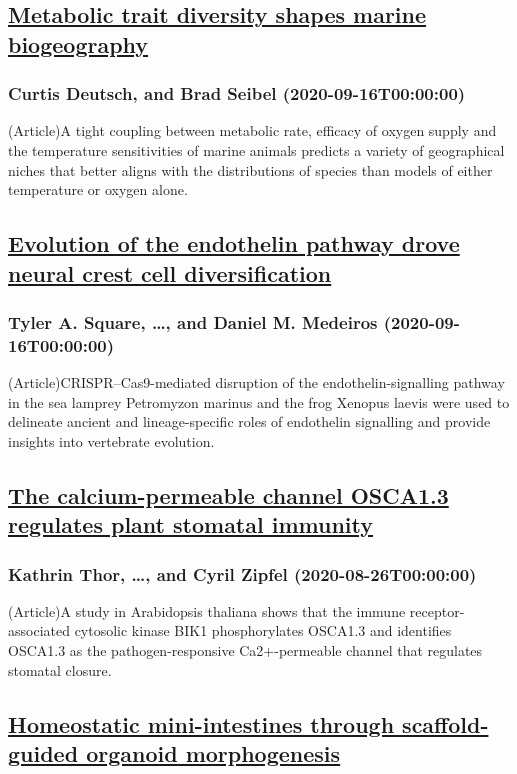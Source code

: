 \subsection*{\href{https://www.nature.com/articles/s41586-020-2721-y}{Metabolic trait diversity shapes marine biogeography}}
\subsubsection*{Curtis Deutsch, and Brad Seibel (2020-09-16T00:00:00)}
(Article)A tight coupling between metabolic rate, efficacy of oxygen supply and the temperature sensitivities of marine animals predicts a variety of geographical niches that better aligns with the distributions of species than models of either temperature or oxygen alone.
\subsection*{\href{https://www.nature.com/articles/s41586-020-2720-z}{Evolution of the endothelin pathway drove neural crest cell diversification}}
\subsubsection*{Tyler A. Square, \dots, and Daniel M. Medeiros (2020-09-16T00:00:00)}
(Article)CRISPR–Cas9-mediated disruption of the endothelin-signalling pathway in the sea lamprey Petromyzon marinus and the frog Xenopus laevis were used to delineate ancient and lineage-specific roles of endothelin signalling and provide insights into vertebrate evolution.
\subsection*{\href{https://www.nature.com/articles/s41586-020-2702-1}{The calcium-permeable channel OSCA1.3 regulates plant stomatal immunity}}
\subsubsection*{Kathrin Thor, \dots, and Cyril Zipfel (2020-08-26T00:00:00)}
(Article)A study in Arabidopsis thaliana shows that the immune receptor-associated cytosolic kinase BIK1 phosphorylates OSCA1.3 and identifies OSCA1.3 as the pathogen-responsive Ca2+-permeable channel that regulates stomatal closure.
\subsection*{\href{https://www.nature.com/articles/s41586-020-2724-8}{Homeostatic mini-intestines through scaffold-guided organoid morphogenesis}}
